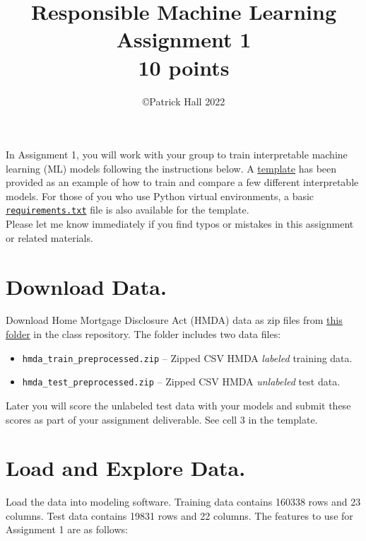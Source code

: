 \documentclass[fleqn]{article}
\title{Responsible Machine Learning\\\Large{Assignment 1}\\\Large{10 points}}
\author{\copyright Patrick Hall 2022}
\begin{document}
\maketitle

\noindent In Assignment 1, you will work with your group to train interpretable machine learning (ML) models following the instructions below. A \href{https://nbviewer.jupyter.org/github/jphall663/GWU_rml/blob/master/assignments/assignment_1/assign_1_template.ipynb?flush_cache=true}{template} has been provided as an example of how to train and compare a few different interpretable models. For those of you who use Python virtual environments, a basic \href{https://github.com/jphall663/GWU_rml/blob/master/assignments/requirements.txt}{\texttt{requirements.txt}} file is also available for the template.\\

\noindent Please let me know immediately if you find typos or mistakes in this assignment or related materials. 

\section{Download Data.}

Download Home Mortgage Disclosure Act (HMDA) data as zip files from \href{https://github.com/jphall663/GWU_rml/tree/master/assignments/data}{this folder} in the class repository. The folder includes two data files:

\begin{itemize}
	\item \texttt{hmda\_train\_preprocessed.zip} -- Zipped CSV HMDA \textit{labeled} training data.
	\item \texttt{hmda\_test\_preprocessed.zip} -- Zipped CSV HMDA \textit{unlabeled} test data.
\end{itemize}

\noindent Later you will score the unlabeled test data with your models and submit these scores as part of your assignment deliverable. See cell 3 in the template.

\section{Load and Explore Data.}

Load the data into modeling software. Training data contains 160338 rows and 23 columns. Test data contains 19831 rows and 22 columns. The features to use for Assignment 1 are as follows:
\end{document}
